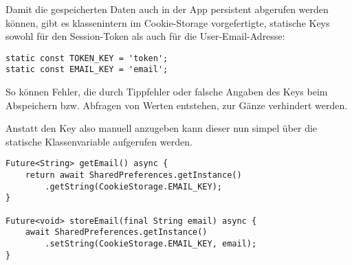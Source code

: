 Damit die gespeicherten Daten auch in der App persistent abgerufen werden können, gibt es klassenintern
im Cookie-Storage vorgefertigte, statische Keys sowohl für den Session-Token als auch für die User-Email-Adresse:

\begin{lstlisting}
static const TOKEN_KEY = 'token';
static const EMAIL_KEY = 'email';
\end{lstlisting}

So können Fehler, die durch Tippfehler oder falsche Angaben des Keys beim Abspeichern bzw. Abfragen
von Werten entstehen, zur Gänze verhindert werden.

Anstatt den Key also manuell anzugeben kann dieser nun simpel über die statische Klassenvariable
aufgerufen werden.

\begin{lstlisting}
Future<String> getEmail() async {
    return await SharedPreferences.getInstance()
        .getString(CookieStorage.EMAIL_KEY);
}

Future<void> storeEmail(final String email) async {
    await SharedPreferences.getInstance()
        .setString(CookieStorage.EMAIL_KEY, email);
}
\end{lstlisting}






